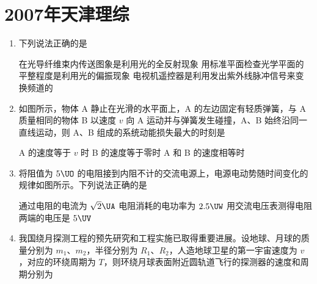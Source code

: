 \documentclass[\gkver]{gaokaozhenti}
\begin{document}
\chapter{2007年天津理综}

\begin{enumerate}
\item
下列说法正确的是

{在光导纤维束内传送图象是利用光的全反射现象}
{用标准平面检查光学平面的平整程度是利用光的偏振现象}
{电视机遥控器是利用发出紫外线脉冲信号来变换频道的}


\item
如图所示，物体 A 静止在光滑的水平面上，A 的左边固定有轻质弹簧，与 A 质量相同的物体 B 以速度 $v$ 向 A 运动并与弹簧发生碰撞，A、B 始终沿同一直线运动，则 A、B 组成的系统动能损失最大的时刻是


{A 的速度等于 $v$ 时}
{B 的速度等于零时}
{A 和 B 的速度相等时}


\item
将阻值为 $5\UO$ 的电阻接到内阻不计的交流电源上，电源电动势随时间变化的规律如图所示。下列说法正确的是


{通过电阻的电流为 $\sqrt{2}\UA$}
{电阻消耗的电功率为 $2.5\UW$}
{用交流电压表测得电阻两端的电压是 $5\UV$}


\item
我国绕月探测工程的预先研究和工程实施已取得重要进展。设地球、月球的质量分别为 $m_{1}$、$m_{2}$，半径分别为 $R_{1}$、$R_{2}$，人造地球卫星的第一宇宙速度为 $v$，对应的环绕周期为 $T$，则环绕月球表面附近圆轨道飞行的探测器的速度和周期分别为


\end{enumerate}
\end{document}
